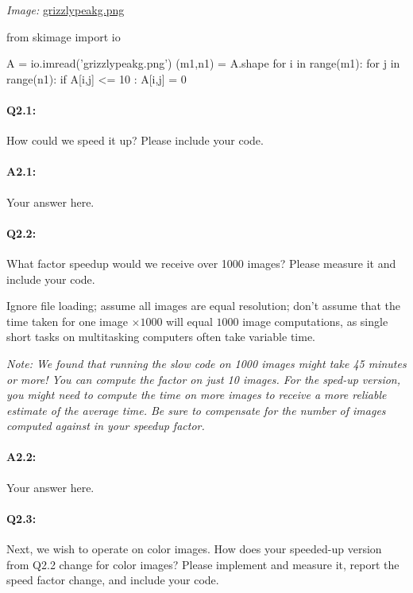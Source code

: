 \documentclass[11pt]{article}
\begin{document}
\emph{Image:} \href{grizzlypeakg.png}{grizzlypeakg.png}

\begin{python}
from skimage import io

A = io.imread('grizzlypeakg.png')
(m1,n1) = A.shape
for i in range(m1):
    for j in range(n1):
        if A[i,j] <= 10 :
            A[i,j] = 0       
\end{python}

\paragraph{Q2.1:} How could we speed it up? Please include your code.

\paragraph{A2.1:} Your answer here.




\pagebreak
\paragraph{Q2.2:} What factor speedup would we receive over 1000 images? Please measure it and include your code.

Ignore file loading; assume all images are equal resolution; don't assume that the time taken for one image $\times1000$ will equal $1000$ image computations, as single short tasks on multitasking computers often take variable time.

\emph{Note: We found that running the slow code on 1000 images might take 45 minutes or more! You can compute the factor on just 10 images. For the sped-up version, you might need to compute the time on more images to receive a more reliable estimate of the average time. Be sure to compensate for the number of images computed against in your speedup factor.}

\paragraph{A2.2:} Your answer here.




\pagebreak
\paragraph{Q2.3:} Next, we wish to operate on color images. How does your speeded-up version from Q2.2 change for color images? Please implement and measure it, report the speed factor change, and include your code.
\end{document}
